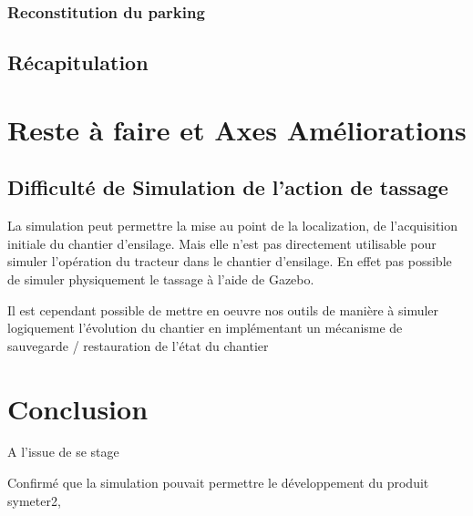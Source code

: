 \documentclass[12pt,a4paper]{report}
\begin{document}
	\subsection{Reconstitution du parking}
	
	
	\section{Récapitulation}
	

\chapter{Reste à faire et Axes Améliorations}


\section{Difficulté de Simulation de l'action de tassage}
La simulation peut permettre la mise au point de la localization, de l'acquisition initiale du chantier d'ensilage. Mais elle n'est pas directement utilisable pour simuler l'opération du tracteur dans le chantier d'ensilage. En effet pas possible de simuler physiquement le tassage à l'aide de Gazebo.

\para Il est cependant possible de mettre en oeuvre nos outils de manière à simuler logiquement l'évolution du chantier en implémentant un mécanisme de sauvegarde / restauration de l'état du chantier



\chapter{Conclusion}

A l'issue de se stage 

Confirmé que la simulation pouvait permettre le développement du produit symeter2,
\end{document}
